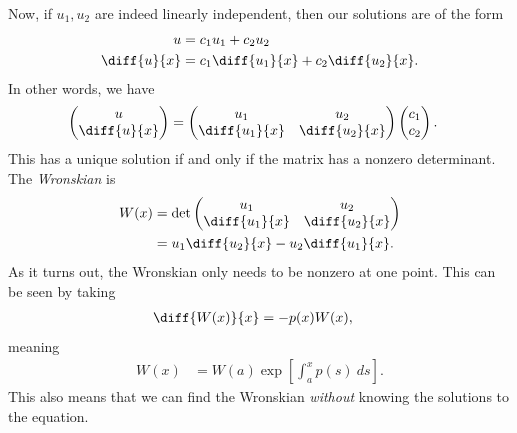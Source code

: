 \documentclass[10pt]{mypackage}
\begin{document}
  Now, if $u_1,u_2$ are indeed linearly independent, then our solutions are of the form
  \begin{align*}
    u &= c_1u_1 + c_2u_2\\
    \diff{u}{x} &= c_1 \diff{u_1}{x} + c_2 \diff{u_2}{x}.
  \end{align*}
  In other words, we have
  \begin{align*}
    \begin{pmatrix}u\\\diff{u}{x}\end{pmatrix} &= \begin{pmatrix}u_1 & u_2 \\ \diff{u_1}{x} & \diff{u_2}{x}\end{pmatrix} \begin{pmatrix}c_1\\c_2\end{pmatrix}.
  \end{align*}
  This has a unique solution if and only if the matrix has a nonzero determinant. The \textit{Wronskian} is
  \begin{align*}
    W(x) &= \det \begin{pmatrix}u_1 & u_2\\ \diff{u_1}{x} & \diff{u_2}{x}\end{pmatrix}\\
         &= u_1 \diff{u_2}{x} - u_2 \diff{u_1}{x}.
  \end{align*}
  As it turns out, the Wronskian only needs to be nonzero at one point. This can be seen by taking
  \begin{align*}
    \diff{W(x)}{x} &= -p(x)W(x),
  \end{align*}
  meaning
  \begin{align*}
    W(x) &= W(a)\exp\left[ \int_{a}^{x} p(s)\:ds \right].
  \end{align*}
  This also means that we can find the Wronskian \textit{without} knowing the solutions to the equation.
\end{document}
